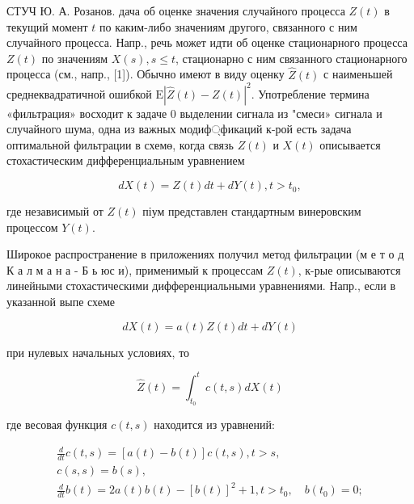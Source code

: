 \documentclass[10pt]{article}
\begin{document}
СТУЧ Ю. А. Розанов. дача об оценке значения случайного процесса $Z(t)$ в текущий момент $t$ по каким-либо значениям другого, связанного с ним случайного процесса. Напр., речь может идти об оценке стационарного процесса $Z(t)$ по значениям $X(s), s \leqslant t$, стационарно с ним связанного стационарного процесса (см., напр., [1]). Обычно имеют в виду оценку $\hat{Z}(t)$ с наименьшей среднеквадратичной ошибкой $\mathrm{E}|\hat{Z}(t)-Z(t)|^{2}$. Употребление термина «фильтрация» восходит к задаче 0 выделении сигнала из "смеси» сигнала и случайного шума, одна из важных модиф্фикаций к-рой есть задача оптимальной фильтрации в схемө, когда связь $Z(t)$ и $X(t)$ описывается стохастическим дифференциальным уравнением



\[

d X(t)=Z(t) d t+d Y(t), t>t_{0},

\]



где независимый от $Z(t)$ піум представлен стандартным винеровским процессом $Y(t)$.



Широкое распространение в приложениях получил метод фильтрации (м е т о д К а л м а н а - Б ь юс и), применимый к процессам $Z(t)$, к-рые описываются линейными стохастическими дифференциальными уравнениями. Напр., если в указанной выпе схеме



\[

d X(t)=a(t) Z(t) d t+d Y(t)

\]



при нулевых начальных условиях, то



\[

\hat{Z}(t)=\int_{t_{0}}^{t} c(t, s) d X(t)

\]



где весовая функция $c(t, s)$ находится из уравнений:



\[

\begin{gathered}

\frac{d}{d t} c(t, s)=[a(t)-b(t)] c(t, s), t>s, \\

c(s, s)=b(s), \\

\frac{d}{d t} b(t)=2 a(t) b(t)-[b(t)]^{2}+1, t>t_{0}, \quad b\left(t_{0}\right)=0 ;

\end{gathered}

\]
\end{document}
